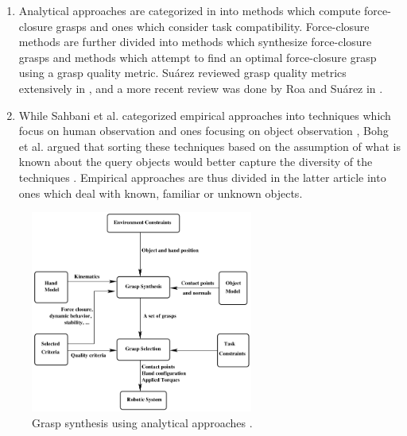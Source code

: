 \documentclass[12pt]{article}
\begin{document}
    \begin{enumerate}
        \item Analytical approaches are categorized in \cite{Sahbani2012} into methods which compute force-closure grasps and ones which consider task compatibility. Force-closure methods are further divided into methods which synthesize force-closure grasps and methods which attempt to find an optimal force-closure grasp using a grasp quality metric. Su\'{a}rez reviewed grasp quality metrics extensively in \cite{suarez2006}, and a more recent review was done by Roa and Su\'{a}rez in \cite{Roa2015}.
        \item While Sahbani et al. categorized empirical approaches into techniques which focus on human observation and ones focusing on object observation \cite{Sahbani2012}, Bohg et al. argued that sorting these techniques based on the assumption of what is known about the query objects would better capture the diversity of the techniques \cite{Bohg2014}. Empirical approaches are thus divided in the latter article into ones which deal with known, familiar or unknown objects.
    \end{enumerate}

    \begin{figure}[H]
        \centering
        \includegraphics[width=0.65\textwidth]{sahbani12-analytic_grasp_strategy}
        \caption{Grasp synthesis using analytical approaches \cite{Sahbani2012}.}
        \label{fig:analytic_grasp}
    \end{figure}
\end{document}
